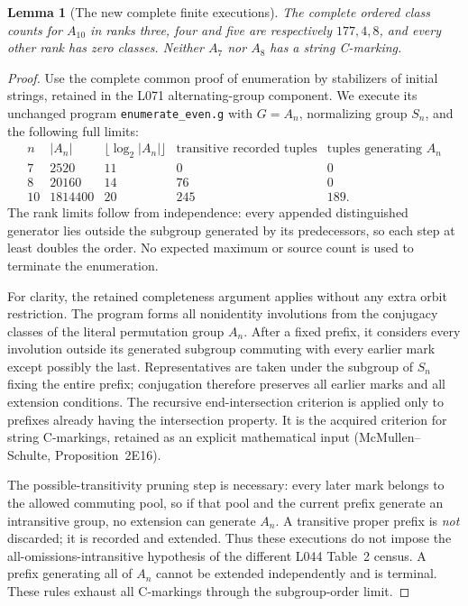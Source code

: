 \documentclass[11pt,a4paper]{article}
\newtheorem{lemma}[theorem]{Lemma}
\begin{document}
\begin{lemma}[The new complete finite executions]\label{new}
The complete ordered class counts for $A_{10}$ in ranks three,
four and five are respectively $177,4,8$, and every other rank
has zero classes. Neither $A_7$ nor $A_8$ has a string C-marking.
\end{lemma}
\begin{proof}
Use the complete common proof of enumeration by stabilizers of
initial strings, retained in the L071 alternating-group component.
We execute its unchanged program \texttt{enumerate\_even.g} with
$G=A_n$, normalizing group $S_n$, and the following full limits:
\[
\begin{array}{c|r|r|r|r}
n&|A_n|&\lfloor\log_2|A_n|\rfloor&
\text{transitive recorded tuples}&\text{tuples generating }A_n\\\hline
7&2520&11&0&0\\
8&20160&14&76&0\\
10&1814400&20&245&189.
\end{array}
\]
The rank limits follow from independence: every appended
distinguished generator lies outside the subgroup generated by
its predecessors, so each step at least doubles the order.
No expected maximum or source count is used to terminate the
enumeration.

For clarity, the retained completeness argument applies without
any extra orbit restriction. The program forms all nonidentity
involutions from the conjugacy classes of the literal permutation
group $A_n$. After a fixed prefix, it considers every involution
outside its generated subgroup commuting with every earlier mark
except possibly the last. Representatives are taken under the
subgroup of $S_n$ fixing the entire prefix; conjugation therefore
preserves all earlier marks and all extension conditions. The
recursive end-intersection criterion is applied only to prefixes
already having the intersection property. It is the acquired
criterion for string C-markings, retained as an explicit
mathematical input (McMullen--Schulte, Proposition~2E16).

The possible-transitivity pruning step is necessary: every later
mark belongs to the allowed commuting pool, so if that pool and
the current prefix generate an intransitive group, no extension
can generate $A_n$. A transitive proper prefix is \emph{not}
discarded; it is recorded and extended. Thus these executions
do not impose the all-omissions-intransitive hypothesis of the
different L044 Table~2 census. A prefix generating all of $A_n$
cannot be extended independently and is terminal. These rules
exhaust all C-markings through the subgroup-order limit.


\end{proof}
\end{document}
